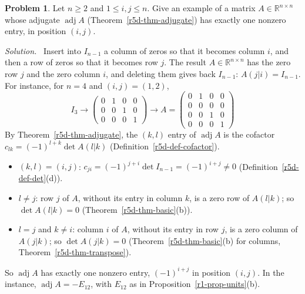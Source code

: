 \documentclass[12pt]{article}
\newcommand{\R}{\mathbb R}
\theoremstyle{definition}
\newtheorem{problem}{Problem}
\newenvironment{solution}{\par\noindent\textit{Solution.}\ }{\par\smallskip}
\begin{document}
\begin{problem}\label{r5d-ex-pr-adj-one-entry}
Let \(n\geqslant2\) and \(1\leqslant i,j\leqslant n\). Give an example of a matrix \(A\in\R^{n\times n}\) whose adjugate
\(\operatorname{adj}A\) (Theorem~\ref{r5d-thm-adjugate}) has exactly one nonzero entry, in position \((i,j)\).
\end{problem}
\begin{solution}
Insert into \(I_{n-1}\) a column of zeros so that it becomes column \(i\), and then a row of zeros so that it becomes
row \(j\). The result \(A\in\R^{n\times n}\) has the zero row \(j\) and the zero column \(i\), and deleting them gives back
\(I_{n-1}\): \(A(j|i)=I_{n-1}\). For instance, for \(n=4\) and \((i,j)=(1,2)\),
\[
I_3\to\begin{pmatrix}0&1&0&0\\0&0&1&0\\0&0&0&1\end{pmatrix}\to A=\begin{pmatrix}0&1&0&0\\0&0&0&0\\0&0&1&0\\0&0&0&1\end{pmatrix}
\]
By Theorem~\ref{r5d-thm-adjugate}, the \((k,l)\) entry of \(\operatorname{adj}A\) is the cofactor
\(c_{lk}=(-1)^{l+k}\det A(l|k)\) (Definition~\ref{r5d-def-cofactor}).
\begin{itemize}
\item \((k,l)=(i,j)\): \(c_{ji}=(-1)^{j+i}\det I_{n-1}=(-1)^{i+j}\ne0\) (Definition~\ref{r5d-def-det}(d)).
\item \(l\ne j\): row \(j\) of \(A\), without its entry in column \(k\), is a zero row of \(A(l|k)\); so \(\det A(l|k)=0\)
(Theorem~\ref{r5d-thm-basic}(b)).
\item \(l=j\) and \(k\ne i\): column \(i\) of \(A\), without its entry in row \(j\), is a zero column of \(A(j|k)\); so
\(\det A(j|k)=0\) (Theorem~\ref{r5d-thm-basic}(b) for columns, Theorem~\ref{r5d-thm-transpose}).
\end{itemize}
So \(\operatorname{adj}A\) has exactly one nonzero entry, \((-1)^{i+j}\) in position \((i,j)\). In the instance,
\(\operatorname{adj}A=-E_{12}\), with \(E_{12}\) as in Proposition~\ref{r1-prop-units}(b).
\end{solution}
\end{document}
